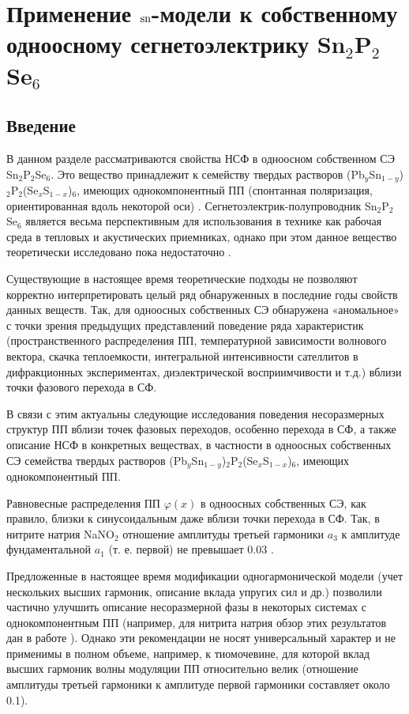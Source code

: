 
\chapter{Применение $\operatorname{sn}$-модели к собственному одноосному сегнетоэлектрику Sn$_2$P$_2$Se$_6$}\label{ch:appl}

\section{Введение}\label{sec:applintro}
В данном разделе рассматриваются свойства НСФ в одноосном собственном СЭ Sn$_2$P$_2$Se$_6$.
Это вещество принадлежит к семейству твердых растворов (Pb$_y$Sn$_{1-y}$)$_2$P$_2$(Se$_x$S$_{1-x}$)$_6$, имеющих однокомпонентный ПП (спонтанная поляризация, ориентированная вдоль некоторой оси) \cite{Vysochanskii1994}. 
Сегнетоэлектрик-полупроводник Sn$_2$P$_2$Se$_6$ является весьма перспективным для использования в технике как рабочая среда в тепловых и акустических приемниках, однако при этом данное вещество теоретически исследовано пока недостаточно \cite{Vysochanskii1994}. 

Существующие в настоящее время теоретические подходы не позволяют корректно интерпретировать целый ряд обнаруженных в последние годы свойств данных веществ. 
Так, для одноосных собственных СЭ обнаружена «аномальное» с точки зрения предыдущих представлений поведение ряда характеристик (пространственного распределения ПП, температурной зависимости волнового вектора, скачка теплоемкости, интегральной интенсивности сателлитов в дифракционных экспериментах, диэлектрической восприимчивости и т.д.) вблизи точки фазового перехода в СФ. 

В связи с этим актуальны следующие исследования поведения несоразмерных структур ПП вблизи точек фазовых переходов, особенно перехода в СФ, а также описание НСФ в конкретных веществах, в частности в одноосных собственных СЭ семейства твердых растворов (Pb$_y$Sn$_{1-y}$)$_2$P$_2$(Se$_x$S$_{1-x}$)$_6$, имеющих однокомпонентный ПП.

Равновесные распределения ПП $\varphi(x)$ в одноосных собственных СЭ, как правило, близки к синусоидальным даже вблизи точки перехода в СФ. 
Так, в нитрите натрия NaNO$_2$ отношение амплитуды третьей гармоники $a_3$ к амплитуде фундаментальной $a_1$ (т. е. первой) не превышает 0.03 \cite{Ema1990}.

Предложенные в настоящее время модификации одногармонической модели (учет нескольких высших гармоник, описание вклада упругих сил и др.) позволили частично улучшить описание несоразмерной фазы в некоторых системах с однокомпонентным ПП (например, для нитрита натрия обзор этих результатов дан в  работе \cite{Ema1990}). Однако эти рекомендации не носят универсальный характер и не применимы в полном объеме, например, к тиомочевине, для которой вклад высших гармоник волны модуляции ПП относительно велик (отношение амплитуды третьей гармоники к амплитуде первой гармоники составляет около 0.1).


